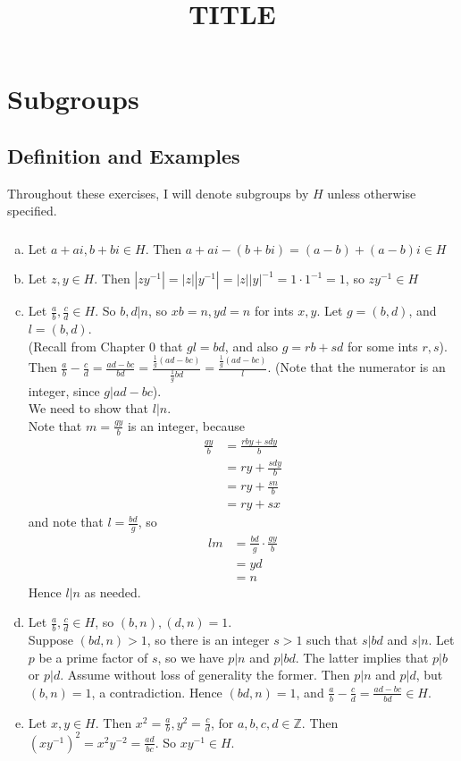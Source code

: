 \documentclass{article}
\title{TITLE}
\newcommand{\ints}{\mathbb{Z}}
\newcommand{\inv}[1]{ {#1}^{-1} }
\begin{document}
\setcounter{tocdepth}{2}
\tableofcontents 
\setcounter{section}{1} 
\section{Subgroups}  

\subsection{Definition and Examples}
Throughout these exercises, I will denote subgroups by $H$ unless otherwise specified.
\subsubsection{}\label{ex1p1}
\begin{enumerate}[(a)]
\item Let $a+ai,b+bi \in H$. Then $a+ai-(b+bi) = (a-b) + (a-b)i \in H$
\item Let $z,y \in H$. Then $|z\inv{y}| = |z||\inv{y}| = |z|\inv{|y|} = 1\cdot \inv{1} = 1$, so $z\inv{y} \in H$
\item Let $\frac{a}{b}, \frac{c}{d} \in H$. So $b,d|n$, so $xb=n,yd=n$ for ints $x,y$. Let $g = (b,d)$, and $l=(b,d)$.\\
(Recall from Chapter 0 that $gl = bd$, and also $g=rb+sd$ for some ints $r,s$).\\
Then $\frac{a}{b}-\frac{c}{d} = \frac{ad-bc}{bd} = \frac{\frac{1}{g}(ad-bc)}{\frac{1}{g}bd} = \frac{\frac{1}{g}(ad-bc)}{l}$. (Note that the numerator is an integer, since $g|ad-bc$).\\
We need to show that $l|n$.\\
Note that $m=\frac{gy}{b}$ is an integer, because
\begin{align*}
\frac{gy}{b} &= \frac{rby+sdy}{b}\\
&= ry + \frac{sdy}{b}\\
&= ry + \frac{sn}{b}\\
&= ry + sx
\end{align*}
and note that $l=\frac{bd}{g}$, so
\begin{align*}
lm &= \frac{bd}{g}\cdot\frac{gy}{b}\\
&= yd\\
&= n
\end{align*}
Hence $l|n$ as needed.
\item Let $\frac{a}{b}, \frac{c}{d} \in H$, so $(b,n),(d,n)=1$.\\
Suppose $(bd,n) > 1$, so there is an integer $s>1$ such that $s|bd$ and $s|n$. Let $p$ be a prime factor of $s$, so we have $p|n$ and $p|bd$. The latter implies that $p|b$ or $p|d$. Assume without loss of generality the former. Then $p|n$ and $p|d$, but $(b,n)=1$, a contradiction. Hence $(bd,n)=1$, and $\frac{a}{b}-\frac{c}{d} = \frac{ad-bc}{bd} \in H$.
\item Let $x,y \in H$. Then $x^2=\frac{a}{b}, y^2=\frac{c}{d}$, for $a,b,c,d \in \ints$. Then $(x\inv{y})^2 = x^2y^{-2}=\frac{ad}{bc}$. So $x\inv{y}\in H$.
\end{enumerate}
\end{document}
